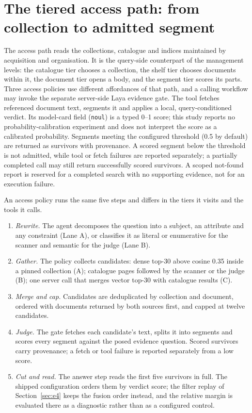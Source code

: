 \section{The tiered access path: from collection to admitted segment}
\label{sec:retrieval}
\label{sec:lanes}

The access path reads the collections, catalogue and indices maintained by
acquisition and organisation. It is the query-side counterpart of the
management levels: the catalogue tier chooses a collection, the shelf tier
chooses documents within it, the document tier opens a body, and the segment
tier scores its parts. Three access policies use different affordances of that
path, and a calling workflow may invoke the separate server-side Laya evidence
gate. The tool fetches referenced document text, segments it and applies a
local, query-conditioned verdict. Its model-card field (\texttt{noul}) is a
typed 0--1 score; this study reports no probability-calibration experiment and
does not interpret the score as a calibrated probability. Segments meeting the
configured threshold (0.5 by default) are returned as survivors with
provenance. A scored segment below the threshold is not admitted, while tool
or fetch failures are reported separately; a partially completed call may
still return successfully scored survivors. A scoped not-found report is
reserved for a completed search with no supporting evidence, not for an
execution failure.

An access policy runs the same five steps and differs in the tiers it visits
and the tools it calls.
\begin{enumerate}
\item \emph{Rewrite.} The agent decomposes the question into a subject, an
attribute and any constraint (Lane A), or classifies it as literal or
enumerative for the scanner and semantic for the judge (Lane B).
\item \emph{Gather.} The policy collects candidates: dense top-30 above cosine
0.35 inside a pinned collection (A); catalogue pages followed by the scanner
or the judge (B); one server call that merges vector top-30 with catalogue
results (C).
\item \emph{Merge and cap.} Candidates are deduplicated by collection and
document, ordered with documents returned by both sources first, and capped at
twelve candidates.
\item \emph{Judge.} The gate fetches each candidate's text, splits it into
segments and scores every segment against the posed evidence question. Scored
survivors carry provenance; a fetch or tool failure is reported separately from
a low score.
\item \emph{Cut and read.} The answer step reads the first five survivors in
full. The shipped configuration orders them by verdict score; the filter replay
of Section~\ref{sec:e4} keeps the fusion order instead, and the relative margin
is evaluated there as a diagnostic rather than as a configured control.
\end{enumerate}

